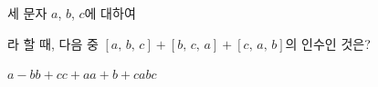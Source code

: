 세 문자 $a$, $b$, $c$에 대하여\par\smallskip{}\par\smallskip\noindent 라 할 때, 다음 중 $[a,\,b,\,c]+[b,\,c,\,a]+[c,\,a,\,b]$의 인수인 것은?
\begin{choices32}{$a-b$}{$b+c$}{$c+a$}{$a+b+c$}{$abc$}\end{choices32}
